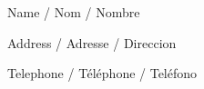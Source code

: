 \vspace*{0.2in}
{
\begin{spacing}{1.2}
\passporttextpromptsmall
Name / Nom / Nombre
\end{spacing}
}
\vspace{0.1in}
\passportunderline{0.2in}
\vspace{0.1in}
{
\begin{spacing}{1.2}
\passporttextpromptsmall
Address / Adresse / Direccion
\end{spacing}
}
\vspace{0.1in}
\passportunderline{0.2in}
\passportunderline{0.2in}
\vspace{0.1in}
{
\begin{spacing}{1.2}
\passporttextpromptsmall
Telephone / Téléphone / Teléfono
\end{spacing}
}
\vspace{0.1in}
\passportunderline{0.2in}
\vspace{0.1in}
\restoregeometry